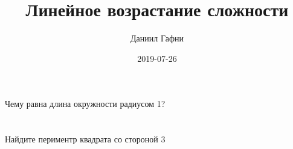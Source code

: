 \documentclass{article}%
\title{Линейное возрастание сложности}%
\author{Даниил Гафни}%
\date{2019{-}07{-}26}%
\begin{document}
%
\normalsize%
\maketitle%
\section{}%
\label{sec:}%
Чему равна длина окружности радиусом 1?%
%
\iffalse%
Автор: Даниил Гафни%
Дата: 2019{-}24{-}07%
Название: None%
Подсказка: \textbackslash{}\textbackslash{}%
Длину окружности можно вычислить по формуле $L=2 \pi R$%
\fi

%
\section{}%
\label{sec:}%
Найдите периментр квадрата со стороной 3%
%
\iffalse%
Автор: Даниил Гафни%
Дата: 2019{-}25{-}07%
Название: None%
Подсказка: \textbackslash{}\textbackslash{}%
Сложите длины сторон квадрата: $a + a + a + a$%
\fi

%
\end{document}
